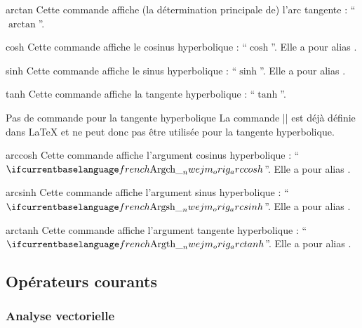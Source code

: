 \begin{docCommand}{arctan}{}
  Cette commande affiche (la détermination principale de) l'arc tangente :
  \enquote{$\arctan$}.
\end{docCommand}

\begin{docCommand}{cosh}{}
  Cette commande affiche le cosinus hyperbolique : \enquote{$\cosh$}. Elle a pour
  alias .
\end{docCommand}

\begin{docCommand}{sinh}{}
  Cette commande affiche le sinus hyperbolique : \enquote{$\sinh$}. Elle a pour
  alias .
\end{docCommand}

\begin{docCommand}{tanh}{}
  Cette commande affiche la tangente hyperbolique : \enquote{$\tanh$}.
  \begin{dbremark}{Pas de commande \protect{} pour la tangente hyperbolique}{}
    La commande |\th| est déjà définie dans \LaTeX{} et ne peut donc pas être
    utilisée pour la tangente hyperbolique.
  \end{dbremark}
\end{docCommand}

\begin{docCommand}{arccosh}{}
  Cette commande affiche l'argument cosinus hyperbolique :
  \enquote{$\arccosh$}. Elle a pour alias .
\end{docCommand}

\begin{docCommand}{arcsinh}{}
  Cette commande affiche l'argument sinus hyperbolique :
  \enquote{$\arcsinh$}. Elle a pour alias .
\end{docCommand}

\begin{docCommand}{arctanh}{}
  Cette commande affiche l'argument tangente hyperbolique :
  \enquote{$\arctanh$}. Elle a pour alias .
\end{docCommand}

\subsection{Opérateurs courants}

\subsubsection{Analyse vectorielle}
\label{sec:analyse-vectorielle}

